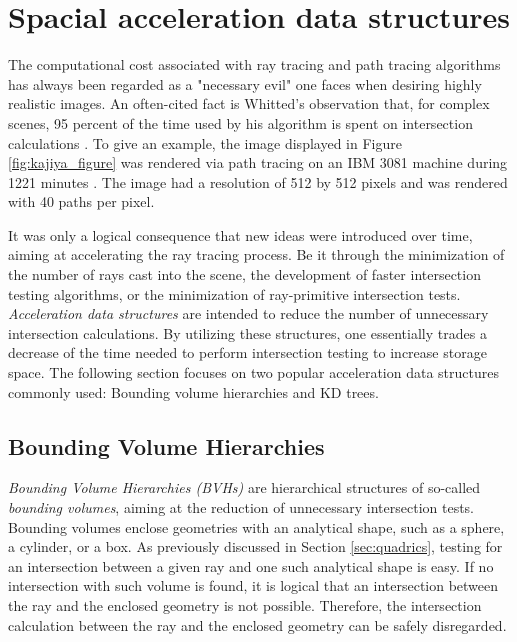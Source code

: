 \section{Spacial acceleration data structures} \label{sec:acceleration}
The computational cost associated with ray tracing and path tracing algorithms has always been regarded as a "necessary evil" one faces when desiring highly realistic images. An often-cited fact is Whitted's observation that, for complex scenes, 95 percent of the time used by his algorithm is spent on intersection calculations \cite[p 349]{whitted1979improved}. To give an example, the image displayed in Figure \ref{fig:kajiya_figure} was rendered via path tracing on an IBM 3081 machine during 1221 minutes \cite[p 149]{kajiya1986rendering}. The image had a resolution of 512 by 512 pixels and was rendered with 40 paths per pixel.

It was only a logical consequence that new ideas were introduced over time, aiming at accelerating the ray tracing process. Be it through the minimization of the number of rays cast into the scene, the development of faster intersection testing algorithms, or the minimization of ray-primitive intersection tests. \emph{Acceleration data structures} are intended to reduce the number of unnecessary intersection calculations. By utilizing these structures, one essentially trades a decrease of the time needed to perform intersection testing to increase storage space. The following section focuses on two popular acceleration data structures commonly used: Bounding volume hierarchies and KD trees.

\subsection{Bounding Volume Hierarchies}

\emph{Bounding Volume Hierarchies (BVHs)} are hierarchical structures of so-called \emph{bounding volumes}, aiming at the reduction of unnecessary intersection tests. Bounding volumes enclose geometries with an analytical shape, such as a sphere, a cylinder, or a box. As previously discussed in Section \ref{sec:quadrics}, testing for an intersection between a given ray and one such analytical shape is easy. If no intersection with such volume is found, it is logical that an intersection between the ray and the enclosed geometry is not possible. Therefore, the intersection calculation between the ray and the enclosed geometry can be safely disregarded. 

